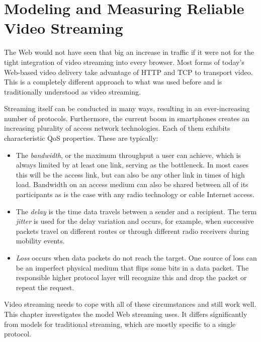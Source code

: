 \chapter{Modeling and Measuring Reliable Video Streaming}
\label{chap:streaming}

The Web would not have seen that big an increase in traffic if it were not for the tight integration of video streaming into every browser. Most forms of today's Web-based video delivery take advantage of \gls{HTTP} and \gls{TCP} to transport video. This is a completely different approach to what was used before and is traditionally understood as video streaming.

Streaming itself can be conducted in many ways, resulting in an ever-increasing number of protocols. Furthermore, the current boom in smartphones creates an increasing plurality of access network technologies. Each of them exhibits characteristic \gls{QoS} properties. These are typically:

\begin{itemize}
	\item The \textit{bandwidth}, or the maximum throughput a user can achieve, which is always limited by at least one link, serving as the bottleneck. In most cases this will be the access link, but can also be any other link in times of high load. Bandwidth on an access medium can also be shared between all of its participants as is the case with any radio technology or cable Internet access.

	\item The \textit{delay} is the time data travels between a sender and a recipient. The term \textit{jitter} is used  for the delay variation and occurs, for example, when successive packets travel on different routes or through different radio receivers during mobility events.

	\item \textit{Loss} occurs when data packets do not reach the target. One source of loss can be an imperfect physical medium that flips some bits in a data packet. The responsible higher protocol layer will recognize this and drop the packet or repeat the request.
\end{itemize}

Video streaming needs to cope with all of these circumstances and still work well. This chapter investigates the model Web streaming uses. It differs significantly from models for traditional streaming, which are mostly specific to a single protocol.

